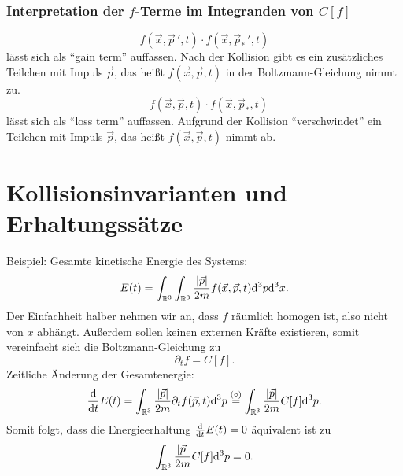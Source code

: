 \subsubsection*{Interpretation der $f$-Terme im Integranden von $C[f]$}
\[ f( \vec{x}, \vec{p}\,', t ) \cdot f( \vec{x}, \vec{p}_*\,', t ) \]
lässt sich als ``gain term'' auffassen. Nach der Kollision gibt es ein
zusätzliches Teilchen mit Impuls $\vec{p}$, das heißt $f( \vec{x}, \vec{p}, t )$
in der Boltzmann-Gleichung nimmt zu.
\[ - f( \vec{x}, \vec{p}, t ) \cdot f( \vec{x}, \vec{p}_*, t ) \]
lässt sich als ``loss term'' auffassen. Aufgrund der Kollision ``verschwindet''
ein Teilchen mit Impuls $\vec{p}$, das heißt $f( \vec{x}, \vec{p}, t )$ nimmt
ab.

\section{Kollisionsinvarianten und Erhaltungssätze}
Beispiel: Gesamte kinetische Energie des Systems:
\[ E(t) = \int_{\mathbb{R}^3} \int_{\mathbb{R}^3} \frac{|\vec{p}|}{2m} f( \vec{x},
  \vec{p}, t ) \mathrm{d}^3 p \mathrm{d}^3 x. \]
Der Einfachheit halber nehmen wir an, dass $f$ räumlich homogen ist, also nicht
von $x$ abhängt. Außerdem sollen keinen externen Kräfte existieren, somit
vereinfacht sich die Boltzmann-Gleichung zu
\[ \partial_t f = C[f]. \tag{$\circ$} \]
Zeitliche Änderung der Gesamtenergie:
\[ \frac{\mathrm{d} }{\mathrm{d} t} E(t) 
  = \int_{\mathbb{R}^3} \frac{|\vec{p}|}{2m} \partial_t f( \vec{p}, t ) \mathrm{d}^3 p
  \overset{(\circ)}{=} \int_{\mathbb{R}^3} \frac{|\vec{p}|}{2m} C[f] \mathrm{d}^3 p. \]
Somit folgt, dass die Energieerhaltung $\frac{\mathrm{d} }{\mathrm{d} t} E(t) = 0$ äquivalent ist zu
\[ \int_{\mathbb{R}^3} \frac{|\vec{p}|}{2m} C[f] \mathrm{d}^3 p = 0. \]

